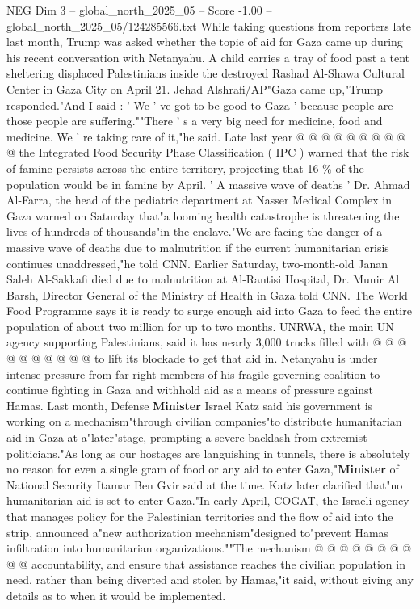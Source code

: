 \begin{textsample}{NEG Dim 3 – global\_north\_2025\_05 – Score -1.00 – global\_north\_2025\_05/124285566.txt}
While taking questions from reporters late last month, Trump was asked whether the topic of aid for Gaza came up during his recent conversation with Netanyahu.
A child carries a tray of food past a tent sheltering displaced Palestinians inside the destroyed Rashad Al-Shawa Cultural Center in Gaza City on April 21.
Jehad Alshrafi/AP"Gaza came up,"Trump responded."And I said : ' We ' ve got to be good to Gaza ' because people are -- those people are suffering.""There ' s a very big need for medicine, food and medicine.
We ' re taking care of it,"he said.
Late last year @ @ @ @ @ @ @ @ @ @ the Integrated Food Security Phase Classification ( IPC ) warned that the risk of famine persists across the entire territory, projecting that 16 \% of the population would be in famine by April. ' A massive wave of deaths ' Dr.
Ahmad Al-Farra, the head of the pediatric department at Nasser Medical Complex in Gaza warned on Saturday that"a looming health catastrophe is threatening the lives of hundreds of thousands"in the enclave."We are facing the danger of a massive wave of deaths due to malnutrition if the current humanitarian crisis continues unaddressed,"he told CNN.
Earlier Saturday, two-month-old Janan Saleh Al-Sakkafi died due to malnutrition at Al-Rantisi Hospital, Dr.
Munir Al Barsh, Director General of the Ministry of Health in Gaza told CNN.
The World Food Programme says it is ready to surge enough aid into Gaza to feed the entire population of about two million for up to two months.
UNRWA, the main UN agency supporting Palestinians, said it has nearly 3,000 trucks filled with @ @ @ @ @ @ @ @ @ @ to lift its blockade to get that aid in.
Netanyahu is under intense pressure from far-right members of his fragile governing coalition to continue fighting in Gaza and withhold aid as a means of pressure against Hamas.
Last month, Defense \textbf{Minister} Israel Katz said his government is working on a mechanism"through civilian companies"to distribute humanitarian aid in Gaza at a"later"stage, prompting a severe backlash from extremist politicians."As long as our hostages are languishing in tunnels, there is absolutely no reason for even a single gram of food or any aid to enter Gaza,"\textbf{Minister} of National Security Itamar Ben Gvir said at the time.
Katz later clarified that"no humanitarian aid is set to enter Gaza."In early April, COGAT, the Israeli agency that manages policy for the Palestinian territories and the flow of aid into the strip, announced a"new authorization mechanism"designed to"prevent Hamas infiltration into humanitarian organizations.""The mechanism @ @ @ @ @ @ @ @ @ @ accountability, and ensure that assistance reaches the civilian population in need, rather than being diverted and stolen by Hamas,"it said, without giving any details as to when it would be implemented.

\end{textsample}
